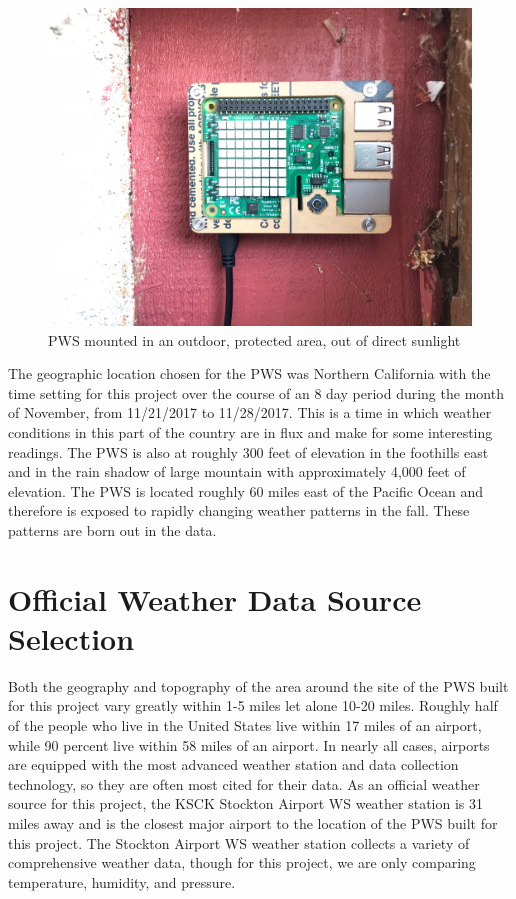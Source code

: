 \documentclass[sigconf]{acmart}
\begin{document}
\begin{figure}[htb]
    \centering
    \includegraphics[width=\columnwidth]{images/Location1.jpg}
    \caption{PWS mounted in an outdoor, protected area, out of direct sunlight}
\end{figure}

The geographic location chosen for the PWS was Northern California with the time setting for this project over the course of an 8 day period during the month of November, from 11/21/2017 to 11/28/2017. This is a time in which weather conditions in this part of the country are in flux and make for some interesting readings. The PWS is also at roughly 300 feet of elevation in the foothills east and in the rain shadow of large mountain with approximately 4,000 feet of elevation. The PWS is located roughly 60 miles east of the Pacific Ocean and therefore is exposed to rapidly changing weather patterns in the fall. These patterns are born out in the data.

\section{Official Weather Data Source Selection}

Both the geography and topography of the area around the site of the PWS built for this project vary greatly within 1-5 miles let alone 10-20 miles. Roughly half of the people who live in the United States live within 17 miles of an airport, while 90 percent live within 58 miles of an airport.\cite{Pearson2017} In nearly all cases, airports are equipped with the most advanced weather station and data collection technology, so they are often most cited for their data. As an official weather source for this project, the KSCK Stockton Airport WS weather station is 31 miles away and is the closest major airport to the location of the PWS built for this project. The Stockton Airport WS weather station collects a variety of comprehensive weather data, though for this project, we are only comparing temperature, humidity, and pressure. 
\end{document}

